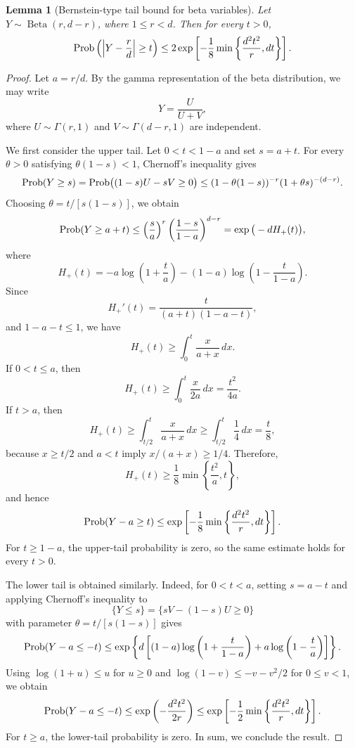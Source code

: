 \documentclass{article}
\newcommand{\Prob}{{\rm Prob}}
\newcommand{\0}{{\mathbf 0}}
\newtheorem{lemma}[theorem]{Lemma}
\numberwithin{equation}{section}
\begin{document}
	\begin{lemma}[Bernstein-type tail bound for beta variables]
		\label{lem:beta-concentration}
		Let $Y\sim\operatorname{Beta}(r,d-r)$, where $1\le r<d$. Then for every $t>0$,
		\[
		\Prob\left(\left|Y-\frac rd\right|\ge t\right)\le 2\exp\left[-\frac{1}{8}\min\left\{\frac{d^2t^2}{r},dt\right\}\right].
		\]
	\end{lemma}
	
	\begin{proof}
		Let $a=r/d$. By the gamma representation of the beta distribution, we may write
		\[
		Y=\frac{U}{U+V},
		\]
		where $U\sim\Gamma(r,1)$ and $V\sim\Gamma(d-r,1)$ are independent.
		
		We first consider the upper tail. Let $0<t<1-a$ and set $s=a+t$. For every $\theta>0$ satisfying $\theta(1-s)<1$, Chernoff's inequality gives
		\[
		\Prob(Y\ge s)=\Prob\big((1-s)U-sV\ge0\big)
		\le (1-\theta(1-s))^{-r}(1+\theta s)^{-(d-r)}.
		\]
		Choosing $\theta=t/[s(1-s)]$, we obtain
		\[
		\Prob(Y\ge a+t)\le \left(\frac{s}{a}\right)^r\left(\frac{1-s}{1-a}\right)^{d-r}
		=\exp\big(-dH_+(t)\big),
		\]
		where
		\[
		H_+(t)=-a\log\left(1+\frac ta\right)-(1-a)\log\left(1-\frac{t}{1-a}\right).
		\]
		Since
		\[
		H_+'(t)=\frac{t}{(a+t)(1-a-t)},
		\]
		and $1-a-t\le1$, we have
		\[
		H_+(t)\ge\int_0^t\frac{x}{a+x}\,dx.
		\]
		If $0<t\le a$, then
		\[
		H_+(t)\ge\int_0^t\frac{x}{2a}\,dx=\frac{t^2}{4a}.
		\]
		If $t>a$, then
		\[
		H_+(t)\ge\int_{t/2}^t\frac{x}{a+x}\,dx\ge\int_{t/2}^t\frac14\,dx=\frac t8,
		\]
		because $x\ge t/2$ and $a<t$ imply $x/(a+x)\ge1/4$. Therefore,
		\[
		H_+(t)\ge\frac18\min\left\{\frac{t^2}{a},t\right\},
		\]
		and hence
		\[
		\Prob(Y-a\ge t)\le\exp\left[-\frac18\min\left\{\frac{d^2t^2}{r},dt\right\}\right].
		\]
		For $t\ge1-a$, the upper-tail probability is zero, so the same estimate holds for every $t>0$.
		
		The lower tail is obtained similarly. Indeed, for $0<t<a$, setting $s=a-t$ and applying Chernoff's inequality to
		\[
		\{Y\le s\}=\{sV-(1-s)U\ge0\}
		\]
		with parameter $\theta=t/[s(1-s)]$ gives
		\[
		\Prob(Y-a\le-t)\le\exp\left\{d\left[(1-a)\log\left(1+\frac{t}{1-a}\right)+a\log\left(1-\frac ta\right)\right]\right\}.
		\]
		Using $\log(1+u)\le u$ for $u\ge0$ and $\log(1-v)\le-v-v^2/2$ for $0\le v<1$, we obtain
		\[
		\Prob(Y-a\le-t)\le\exp\left(-\frac{d^2t^2}{2r}\right)
		\le\exp\left[-\frac12\min\left\{\frac{d^2t^2}{r},dt\right\}\right].
		\]
		For $t\ge a$, the lower-tail probability is zero.
		In sum, we conclude the result.
	\end{proof}
	
\end{document}
